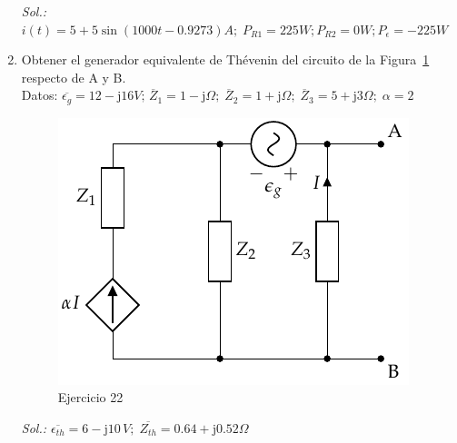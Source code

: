 \begin{enumerate}
\emph{Sol.: $i(t) = 5 + 5\sin(1000t - 0.9273){A};\; P_{R1} = {225}{W}; P_{R2} = {0}{W}; P_{\epsilon} = -{225}{W}$}

\item Obtener el generador equivalente de Thévenin del circuito de la Figura~\ref{fig.ej22_BT2} respecto de A y B.\\
Datos: $\overline{\epsilon_g} = {12 - \mathrm{j}16}{V};\, \overline{Z}_1 = {1 - \mathrm{j}}{\Omega};\; \overline{Z}_2 = {1 + \mathrm{j}}{\Omega};\; \overline{Z}_3 = {5 + \mathrm{j}3}{\Omega};\; \alpha = 2$

\begin{figure}[H]
    \centering
    \includegraphics{../figs/Thevenin4.pdf}
    \caption{Ejercicio 22}
    \label{fig.ej22_BT2}
\end{figure}

\emph{Sol.: $\overline{\epsilon_{th}}=6 - \mathrm{j}10\,V;\;\overline{Z_{th}}=0.64 + \mathrm{j} 0.52{\Omega}$}

\end{enumerate}
